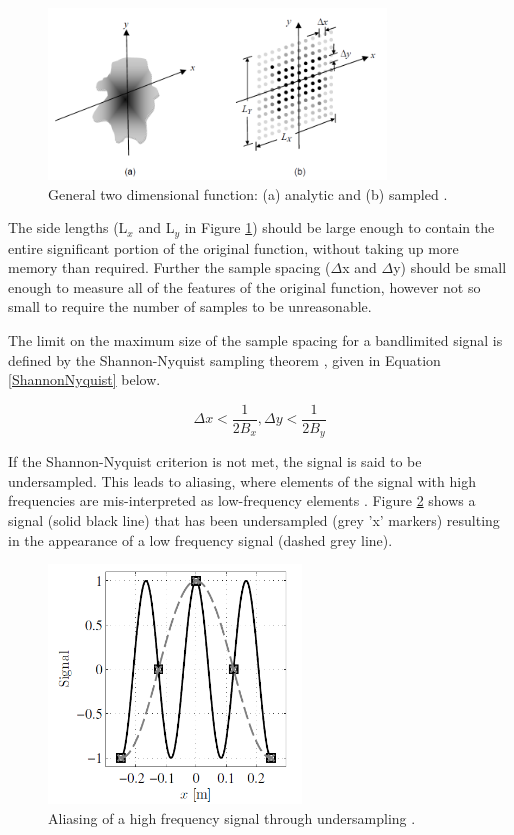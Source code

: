 \begin{figure}[H]
	\centering
		\includegraphics[width=0.8\textwidth]{figures/GeneralSampling.PNG}
	\caption{General two dimensional function: (a) analytic and (b) sampled \cite{CFO}.}
	\label{fig:GenSample}
\end{figure}

The side lengths (L$_x$ and L$_y$ in Figure \ref{fig:GenSample}) should be large enough to contain the entire significant portion of the original function, without taking up more memory than required.  Further the sample spacing ($\Delta$x and $\Delta$y) should be small enough to measure all of the features of the original function, however not so small to require the number of samples to be unreasonable.  

The limit on the maximum size of the sample spacing for a bandlimited signal is defined by the Shannon-Nyquist sampling theorem \cite{CFO}, given in Equation \ref{ShannonNyquist} below.  

\begin{equation}
\Delta x < \frac{1}{2B_x}  ,  \Delta y < \frac{1}{2B_y}
\label{ShannonNyquist}
\end{equation}

If the Shannon-Nyquist criterion is not met, the signal is said to be undersampled.  This leads to aliasing, where elements of the signal with high frequencies are mis-interpreted as low-frequency elements \cite{CFO}.  Figure \ref{fig:Aliasing} shows a signal (solid black line) that has been undersampled (grey 'x' markers) resulting in the appearance of a low frequency signal (dashed grey line).  

\begin{figure}[H]
	\centering
		\includegraphics[width=0.6\textwidth]{figures/Alias.PNG}
	\caption{Aliasing of a high frequency signal through undersampling \cite{NSOWP}.}
	\label{fig:Aliasing}
\end{figure}

